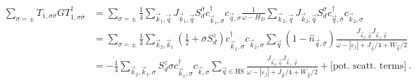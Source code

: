 \documentclass{revtex4-2}
\begin{document}
\begin{equation}\begin{aligned}
	\sum_{\sigma=\pm}T_{1,\sigma\bar\sigma} G T^\dagger_{1,\sigma\bar\sigma} &= \sum_{\sigma=\pm}\frac{1}{4} \sum_{\vec k_1,\vec q}J_{\vec k_1,\vec q} S_d^{\bar\sigma} c^\dagger_{\vec k_1,\sigma} c_{\vec q,\bar\sigma} \frac{1}{\omega - H_D}\sum_{\vec k_2,\vec q}J_{\vec k_2,\vec q} S_d^\sigma c^\dagger_{\vec q,\bar\sigma} c_{\vec k_2,\sigma}\\
										 &= \sum_{\sigma=\pm}\frac{1}{4}\sum_{\vec k_2,\vec k_1} \left(\frac{1}{2} + \bar\sigma S_d^z\right) c^\dagger_{\vec k_1,\sigma} c_{\vec k_2,\sigma} \sum_{\vec q} \left(1 - \hat n_{\vec q,\bar\sigma}\right) \frac{J_{\vec k_2,\vec q} J_{\vec k_1,\vec q}}{\omega - |\varepsilon_j| + J_{\vec q}/4 + W_{\vec q}/2}\\
										 &= -\frac{1}{4}\sum_{\vec k_2,\vec k_1, \sigma} S_d^z \sigma c^\dagger_{\vec k_1,\sigma}c_{\vec k,\sigma} \sum_{\vec q \in \text{HS}} \frac{J_{\vec k_2,\vec q} J_{\vec k_1,\vec q}}{\omega - |\varepsilon_j| + J_{\vec q}/4 + W_{\vec q}/2} + \bigg[\text{pot. scatt. terms}\bigg]~.
\end{aligned}\end{equation}
\end{document}
